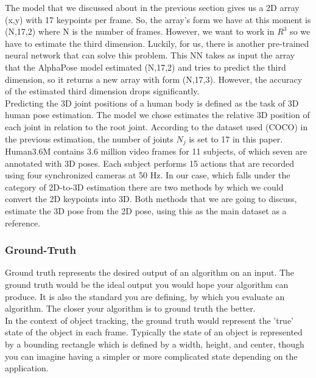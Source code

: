 The model that we discussed about in the previous section gives us a 2D array (x,y) with 17 keypoints per frame. So, the array's form we have at this moment is (N,17,2) where N is the number of frames. However, we want to work in $R^3$ so we have to estimate the third dimension.  Luckily, for us, there is another pre-trained neural network that can solve this problem. This NN takes as input the array that the AlphaPose model estimated (N,17,2) and tries to predict the third dimension, so it returns a new array with form (N,17,3). However, the accuracy of the estimated third dimension drops significantly. \\


Predicting the 3D joint positions of a human body is defined as the task of 3D human pose estimation. The model we chose estimates the relative 3D position of each joint in relation to the root joint. According to the dataset used (COCO) in the previous estimation, the number of joints $N_j$ is set to 17 in this paper.\\

Human3.6M contains 3.6 million video frames for 11 subjects, of which seven are annotated with 3D poses. Each subject performs 15 actions that are recorded using four synchronized cameras at 50 Hz. In our case, which falls under the category of 2D-to-3D estimation there are two methods by which we could convert the 2D keypoints into 3D. Both methods that we are going to discuss, estimate the 3D pose from the 2D pose, using this as the main dataset as a reference.\\

\subsubsection*{Ground-Truth}

Ground truth represents the desired output of an algorithm on an input. The ground truth would be the ideal output you would hope your algorithm can produce. It is also the standard you are defining, by which you evaluate an algorithm. The closer your algorithm is to ground truth the better.\\

In the context of object tracking, the ground truth would represent the 'true' state of the object in each frame. Typically the state of an object is represented by a bounding rectangle which is defined by a width, height, and center, though you can imagine having a simpler or more complicated state depending on the application.\\

